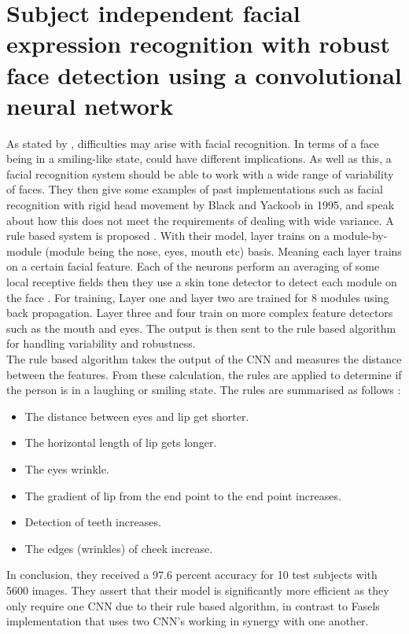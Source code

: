 \section*{Subject independent facial expression recognition with robust face detection using a convolutional neural network}
As stated by \citeauthor{MATSUGU}, difficulties may arise with facial recognition. In terms of a face being in a smiling-like state, could have different implications. As well as this, a facial recognition system should be able to work with a wide range of variability of faces. They then give some examples of past implementations such as facial recognition with rigid head movement by Black and Yackoob in 1995, and speak about how this does not meet the requirements of dealing with wide variance. A rule based system is proposed \citep{MATSUGU}. With their model, layer trains on a module-by-module (module being the nose, eyes, mouth etc) basis. Meaning each layer trains on a certain facial feature. Each of the neurons perform an averaging of some local receptive fields then they use a skin tone detector to detect each module on the face \citep{MATSUGU}. For training, Layer one and layer two are trained for 8 modules using back propagation. Layer three and four train on more complex feature detectors such as the mouth and eyes. The output is then sent to the rule based algorithm for handling variability and robustness. \\
The rule based algorithm takes the output of the CNN and measures the distance between the features. From these calculation, the rules are applied to determine if the person is in a laughing or smiling state. The rules are summarised as follows \citep{MATSUGU}:
\begin{itemize}
	\item The distance between eyes and lip get shorter.
	\item The horizontal length of lip gets longer.
	\item The eyes wrinkle.
	\item The gradient of lip from the end point to the end point increases.
	\item Detection of teeth increases.
	\item The edges (wrinkles) of cheek increase.
\end{itemize}
In conclusion, they received a 97.6 percent accuracy for 10 test subjects with 5600 images. They assert that their model is significantly more efficient as they only require one CNN due to their rule based algorithm, in contrast to Fasels implementation that uses two CNN's working in synergy with one another.

